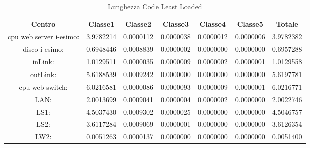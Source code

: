 \begin{table}[H]
\begin{center}\begin{scriptsize}
\begin{tabular}{||c|c|c|c|c|c|c||}
\hline
Centro &Classe1 &Classe2 &Classe3 &Classe4 &Classe5 &Totale\\
\hline
\hline
 cpu web server i-esimo: 	&3.9782214	&0.0000112	&0.0000038	&0.0000012	&0.0000006	&3.9782382\\
\hline
 disco i-esimo: 	&0.6948446	&0.0008839	&0.0000002	&0.0000000	&0.0000000	&0.6957288\\
\hline
 inLink: 	&1.0129511	&0.0000035	&0.0000009	&0.0000002	&0.0000001	&1.0129558\\
\hline
 outLink: 	&5.6188539	&0.0009242	&0.0000000	&0.0000000	&0.0000000	&5.6197781\\
\hline
 cpu web switch: 	&6.0216581	&0.0000086	&0.0000093	&0.0000009	&0.0000001	&6.0216771\\
\hline
 LAN: 	&2.0013699	&0.0009041	&0.0000004	&0.0000002	&0.0000000	&2.0022746\\
\hline
 LS1: 	&4.5037430	&0.0009302	&0.0000025	&0.0000000	&0.0000000	&4.5046757\\
\hline
 LS2: 	&3.6117284	&0.0009069	&0.0000001	&0.0000000	&0.0000000	&3.6126354\\
\hline
 LW2: 	&0.0051263	&0.0000137	&0.0000000	&0.0000000	&0.0000000	&0.0051400\\
\hline
\end{tabular}
\end{scriptsize}\end{center}
\caption{Lunghezza Code Least Loaded}
\label{lunghezzacode}
\end{table}

